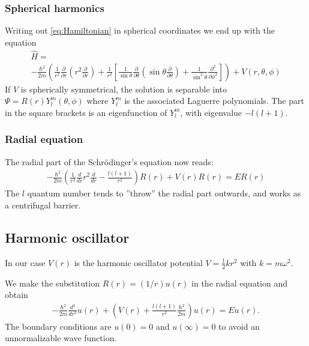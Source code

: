 \documentclass[11pt,a4paper,english,final]{article}
\numberwithin{equation}{section}
\let\oldhat\hat
\renewcommand{\hat}[1]{\oldhat{#1}}
\begin{document}
\subsubsection{Spherical harmonics}
Writing out \eqref{eq:Hamiltonian} in spherical coordinates we end up
with the equation
\begin{gather}
\nonumber \hat{H} = \\
-\frac{\hbar^2}{2m}\left(\frac{1}{r^2}\frac{\partial}{\partial r}
\left( r^2\frac{\partial }{\partial r}\right)
+ \frac{1}{r^2}\left[ \frac{1}{\sin\theta}\frac{\partial}{\partial \theta}
\left( \sin\theta \frac{\partial}{\partial \theta}\right)
+ \frac{1}{\sin^2\theta}\frac{\partial^2}{\partial \phi^2}
\right]\right) + V(r,\theta,\phi)
\end{gather}
If $V$ is spherically symmetrical, the solution is separable into
$\Psi = R(r)Y_l^m(\theta, \phi)$ where $Y_l^m$ is the associated Laguerre
polynomials. The part in the square brackets is an eigenfunction of 
$Y_l^m$, with eigenvalue $-l(l+1)$. 


\subsubsection{Radial equation}

The radial part of the Schrödinger's equation now reads:
\begin{gather}
  -\frac{\hbar^2}{2 m} \left ( \frac{1}{r^2} \frac{d}{dr} r^2
  \frac{d}{dr} - \frac{l (l + 1)}{r^2} \right )R(r) 
     + V(r) R(r) = E R(r)
\label{eq:radial}
\end{gather}
The $l$ quantum number tends to ''throw'' the radial part outwards,
and works as a centrifugal barrier.

\subsection{Harmonic oscillator}
In our case $V(r)$ is the harmonic oscillator potential 
$V = \frac{1}{2}k r^2$ with
$k=m\omega^2$. 

We make the substitution $R(r) = (1/r) u(r)$ in the radial
equation and obtain
\begin{gather}
  -\frac{\hbar^2}{2 m} \frac{d^2}{dr^2} u(r) 
       + \left ( V(r) + \frac{l (l + 1)}{r^2}\frac{\hbar^2}{2 m}
                                    \right ) u(r)  = E u(r) .
\end{gather}
The boundary conditions are $u(0)=0$ and $u(\infty)=0$ to avoid
an unnormalizable wave function.
\end{document}
